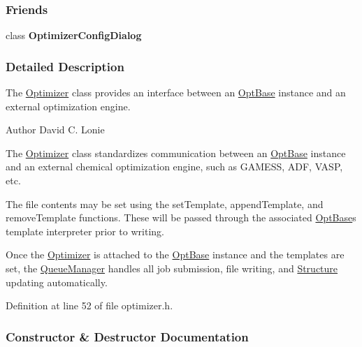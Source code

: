 \subsubsection*{Friends}
\begin{DoxyCompactItemize}
\item 
\hypertarget{classGlobalSearch_1_1Optimizer_a820134b906cccccfc214c45661db99bf}{}class {\bfseries Optimizer\+Config\+Dialog}\label{classGlobalSearch_1_1Optimizer_a820134b906cccccfc214c45661db99bf}

\end{DoxyCompactItemize}


\subsubsection{Detailed Description}
The \hyperlink{classGlobalSearch_1_1Optimizer}{Optimizer} class provides an interface between an \hyperlink{classGlobalSearch_1_1OptBase}{Opt\+Base} instance and an external optimization engine. 

\begin{DoxyAuthor}{Author}
David C. Lonie
\end{DoxyAuthor}
The \hyperlink{classGlobalSearch_1_1Optimizer}{Optimizer} class standardizes communication between an \hyperlink{classGlobalSearch_1_1OptBase}{Opt\+Base} instance and an external chemical optimization engine, such as G\+A\+M\+E\+S\+S, A\+D\+F, V\+A\+S\+P, etc.

The file contents may be set using the set\+Template, append\+Template, and remove\+Template functions. These will be passed through the associated \hyperlink{classGlobalSearch_1_1OptBase}{Opt\+Base}\textquotesingle{}s template interpreter prior to writing.

Once the \hyperlink{classGlobalSearch_1_1Optimizer}{Optimizer} is attached to the \hyperlink{classGlobalSearch_1_1OptBase}{Opt\+Base} instance and the templates are set, the \hyperlink{classGlobalSearch_1_1QueueManager}{Queue\+Manager} handles all job submission, file writing, and \hyperlink{classGlobalSearch_1_1Structure}{Structure} updating automatically. 

Definition at line 52 of file optimizer.\+h.



\subsubsection{Constructor \& Destructor Documentation}
\hypertarget{classGlobalSearch_1_1Optimizer_a8c5a3335ff76f8a6a21a160d0139d842}{}
